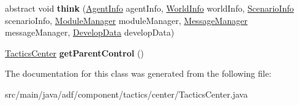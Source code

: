 \begin{DoxyCompactItemize}
\item 
\hypertarget{classadf_1_1component_1_1tactics_1_1center_1_1TacticsCenter_a0d3eb45ee935ba1bbb5939cdb3123ba7}{}\label{classadf_1_1component_1_1tactics_1_1center_1_1TacticsCenter_a0d3eb45ee935ba1bbb5939cdb3123ba7} 
abstract void {\bfseries think} (\hyperlink{classadf_1_1agent_1_1info_1_1AgentInfo}{Agent\+Info} agent\+Info, \hyperlink{classadf_1_1agent_1_1info_1_1WorldInfo}{World\+Info} world\+Info, \hyperlink{classadf_1_1agent_1_1info_1_1ScenarioInfo}{Scenario\+Info} scenario\+Info, \hyperlink{classadf_1_1agent_1_1module_1_1ModuleManager}{Module\+Manager} module\+Manager, \hyperlink{classadf_1_1agent_1_1communication_1_1MessageManager}{Message\+Manager} message\+Manager, \hyperlink{classadf_1_1agent_1_1develop_1_1DevelopData}{Develop\+Data} develop\+Data)
\item 
\hypertarget{classadf_1_1component_1_1tactics_1_1center_1_1TacticsCenter_a23ee0aa5f0fa412f626b3da7213ccad6}{}\label{classadf_1_1component_1_1tactics_1_1center_1_1TacticsCenter_a23ee0aa5f0fa412f626b3da7213ccad6} 
\hyperlink{classadf_1_1component_1_1tactics_1_1center_1_1TacticsCenter}{Tactics\+Center} {\bfseries get\+Parent\+Control} ()
\end{DoxyCompactItemize}


The documentation for this class was generated from the following file\+:\begin{DoxyCompactItemize}
\item 
src/main/java/adf/component/tactics/center/Tactics\+Center.\+java\end{DoxyCompactItemize}
